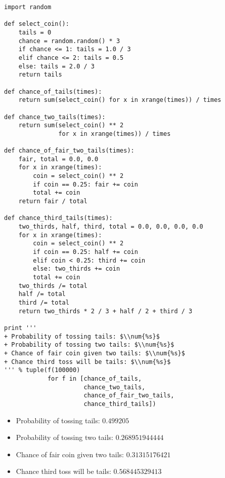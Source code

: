 \documentclass[11pt]{article}
\begin{document}
\lstset{language=Python,numbers=none}
\begin{lstlisting}
import random

def select_coin():
    tails = 0
    chance = random.random() * 3
    if chance <= 1: tails = 1.0 / 3
    elif chance <= 2: tails = 0.5
    else: tails = 2.0 / 3
    return tails

def chance_of_tails(times):
    return sum(select_coin() for x in xrange(times)) / times

def chance_two_tails(times):
    return sum(select_coin() ** 2
               for x in xrange(times)) / times

def chance_of_fair_two_tails(times):
    fair, total = 0.0, 0.0
    for x in xrange(times):
        coin = select_coin() ** 2
        if coin == 0.25: fair += coin
        total += coin
    return fair / total

def chance_third_tails(times):
    two_thirds, half, third, total = 0.0, 0.0, 0.0, 0.0
    for x in xrange(times):
        coin = select_coin() ** 2
        if coin == 0.25: half += coin
        elif coin < 0.25: third += coin
        else: two_thirds += coin
        total += coin
    two_thirds /= total
    half /= total
    third /= total
    return two_thirds * 2 / 3 + half / 2 + third / 3

print '''
+ Probability of tossing tails: $\\num{%s}$
+ Probability of tossing two tails: $\\num{%s}$
+ Chance of fair coin given two tails: $\\num{%s}$
+ Chance third toss will be tails: $\\num{%s}$
''' % tuple(f(100000)
            for f in [chance_of_tails,
                      chance_two_tails,
                      chance_of_fair_two_tails,
                      chance_third_tails])
\end{lstlisting}

\begin{itemize}
\item Probability of tossing tails: $\num{0.499205}$
\item Probability of tossing two tails: $\num{0.268951944444}$
\item Chance of fair coin given two tails: $\num{0.31315176421}$
\item Chance third toss will be tails: $\num{0.568445329413}$
\end{itemize}
\end{document}
